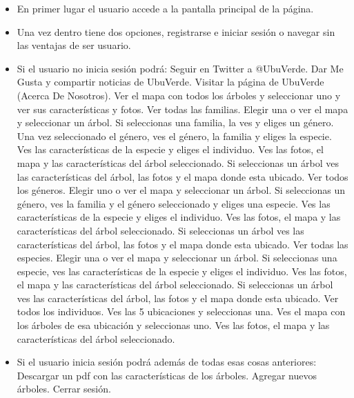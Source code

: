 \begin{itemize}
	\item En primer lugar el usuario accede a la pantalla principal de la página.
	\item Una vez dentro tiene dos opciones, registrarse e iniciar sesión o navegar sin las ventajas de ser usuario.
	\item Si el usuario no inicia sesión podrá:
	\subitem Seguir en Twitter a @UbuVerde.
	\subitem Dar Me Gusta y compartir noticias de UbuVerde.
	\subitem Visitar la página de UbuVerde (Acerca De Nosotros).
	\subitem Ver el mapa con todos los árboles y seleccionar uno y ver sus características y fotos.
	\subitem Ver todas las familias.
	\subsubitem Elegir una o ver el mapa y seleccionar un árbol.
	\subsubitem Si seleccionas una familia, la ves y eliges un género.
	\subsubitem Una vez seleccionado el género, ves el género, la familia y eliges la especie.
	\subsubitem Ves las características de la especie y eliges el individuo.
	\subsubitem Ves las fotos, el mapa y las características del árbol seleccionado.
	\subsubitem Si seleccionas un árbol ves las características del árbol, las fotos y el mapa donde esta ubicado.
	\subitem Ver todos los géneros.
	\subsubitem Elegir uno o ver el mapa y seleccionar un árbol.
	\subsubitem Si seleccionas un género, ves la familia y el género seleccionado y eliges una especie.
	\subsubitem Ves las características de la especie y eliges el individuo.
	\subsubitem Ves las fotos, el mapa y las características del árbol seleccionado.
	\subsubitem Si seleccionas un árbol ves las características del árbol, las fotos y el mapa donde esta ubicado.
	\subitem Ver todas las especies.
	\subsubitem Elegir una o ver el mapa y seleccionar un árbol.
	\subsubitem Si seleccionas una especie, ves las características de la especie y eliges el individuo.
	\subsubitem Ves las fotos, el mapa y las características del árbol seleccionado.
	\subsubitem Si seleccionas un árbol ves las características del árbol, las fotos y el mapa donde esta ubicado.
	\subitem Ver todos los individuos.
	\subsubitem Ves las 5 ubicaciones y seleccionas una.
	\subsubitem Ves el mapa con los árboles de esa ubicación y seleccionas uno.
	\subsubitem Ves las fotos, el mapa y las características del árbol seleccionado.
	\item Si el usuario inicia sesión podrá además de todas esas cosas anteriores:
	\subitem Descargar un pdf con las características de los árboles.
	\subitem Agregar nuevos árboles.
	\subitem Cerrar sesión.

\end{itemize}

